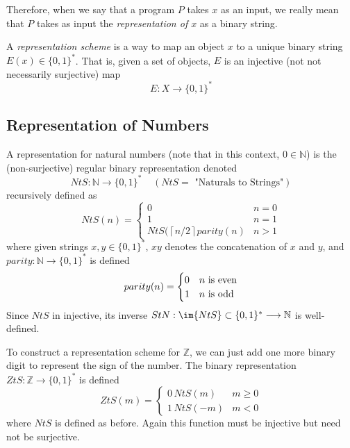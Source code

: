 \documentclass{article}
\begin{document}
  Therefore, when we say that a program $P$ takes $x$ as an input, we really mean that $P$ takes as input the \textit{representation of $x$} as a binary string.  

  \begin{definition}
  A \textit{representation scheme} is a way to map an object $x$ to a unique binary string $E(x) \in \{0,1\}^*$. That is, given a set of objects, $E$ is an injective (not not necessarily surjective) map
  \[E: X \longrightarrow \{0,1\}^*\]
  \end{definition}

  \subsection{Representation of Numbers}
  \begin{definition}
  A representation for natural numbers (note that in this context, $0 \in \mathbb{N}$) is the (non-surjective) regular binary representation denoted
  \[NtS: \mathbb{N} \longrightarrow \{0,1\}^* \;\;\;\; (NtS= \text{ "Naturals to Strings"})\]
  recursively defined as 
  \[NtS(n) = \begin{cases}
  0 & n = 0 \\
  1 & n = 1 \\
  NtS(\left \lceil{n/2}\right \rceil parity(n) & n > 1 
  \end{cases}\]
  where given strings $x, y \in \{0,1\}^*$, $xy$ denotes the concatenation of $x$ and $y$, and $parity: \mathbb{N} \longrightarrow \{0,1\}^*$ is defined 
  \[parity(n) = \begin{cases}
  0 & n $\text{ is even}$ \\
  1 & n $\text{ is odd}$
  \end{cases}\]
  Since $NtS$ in injective, its inverse $StN: \im{NtS} \subset \{0,1\}^* \longrightarrow \mathbb{N}$ is well-defined. 
  \end{definition}

  \begin{definition}
  To construct a representation scheme for $\mathbb{Z}$, we can just add one more binary digit to represent the sign of the number. The binary representation $ZtS: \mathbb{Z} \longrightarrow \{0, 1\}^*$ is defined
  \[ZtS(m) = \begin{cases}
  0\, NtS(m) & m \geq 0 \\
  1 \, NtS(-m) & m < 0
  \end{cases}\]
  where $NtS$ is defined as before. Again this function must be injective but need not be surjective. 
  \end{definition}
\end{document}
